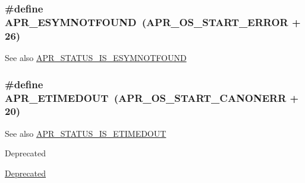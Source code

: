 \subsubsection[{\texorpdfstring{A\+P\+R\+\_\+\+E\+S\+Y\+M\+N\+O\+T\+F\+O\+U\+ND}{APR_ESYMNOTFOUND}}]{\setlength{\rightskip}{0pt plus 5cm}\#define A\+P\+R\+\_\+\+E\+S\+Y\+M\+N\+O\+T\+F\+O\+U\+ND~({\bf A\+P\+R\+\_\+\+O\+S\+\_\+\+S\+T\+A\+R\+T\+\_\+\+E\+R\+R\+OR} + 26)}\hypertarget{group___a_p_r___error_ga8d96410fc32408160e1e85e2e96402fa}{}\label{group___a_p_r___error_ga8d96410fc32408160e1e85e2e96402fa}
\begin{DoxySeeAlso}{See also}
\hyperlink{group___a_p_r___s_t_a_t_u_s___i_s_gac8b05afdaacdfaa84454ace43464ed84}{A\+P\+R\+\_\+\+S\+T\+A\+T\+U\+S\+\_\+\+I\+S\+\_\+\+E\+S\+Y\+M\+N\+O\+T\+F\+O\+U\+ND} 
\end{DoxySeeAlso}
\subsubsection[{\texorpdfstring{A\+P\+R\+\_\+\+E\+T\+I\+M\+E\+D\+O\+UT}{APR_ETIMEDOUT}}]{\setlength{\rightskip}{0pt plus 5cm}\#define A\+P\+R\+\_\+\+E\+T\+I\+M\+E\+D\+O\+UT~({\bf A\+P\+R\+\_\+\+O\+S\+\_\+\+S\+T\+A\+R\+T\+\_\+\+C\+A\+N\+O\+N\+E\+RR} + 20)}\hypertarget{group___a_p_r___error_ga6aeccbe9accb34f0adc1cb1ab9a82a8d}{}\label{group___a_p_r___error_ga6aeccbe9accb34f0adc1cb1ab9a82a8d}
\begin{DoxySeeAlso}{See also}
\hyperlink{group___a_p_r___s_t_a_t_u_s___i_s_gaaebbfb9eaa474d3e6da99e2b3eb6e3d1}{A\+P\+R\+\_\+\+S\+T\+A\+T\+U\+S\+\_\+\+I\+S\+\_\+\+E\+T\+I\+M\+E\+D\+O\+UT} 
\end{DoxySeeAlso}
\begin{DoxyRefDesc}{Deprecated}
\item[\hyperlink{deprecated__deprecated000001}{Deprecated}]\end{DoxyRefDesc}
